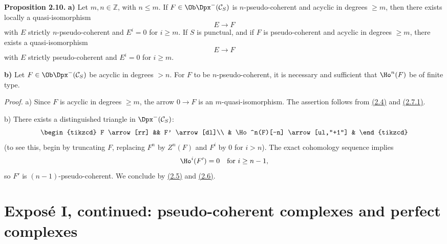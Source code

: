 \textbf{Proposition 2.10.} \textbf{a)} Let \(m,n\in\mathbb Z\), with \(n\leq m\). If \(F\in\Ob\Dpx^-(\mathcal C_S)\) is \(n\)-pseudo-coherent and acyclic in degrees \(\geq m\), then there exists locally a quasi-isomorphism
\[
  E\longrightarrow F
\]
with \(E\) strictly \(n\)-pseudo-coherent and \(E^i=0\) for \(i\geq m\). If \(S\) is punctual, and if \(F\) is pseudo-coherent and acyclic in degrees \(\geq m\), there exists a quasi-isomorphism
\[
  E\longrightarrow F
\]
with \(E\) strictly pseudo-coherent and \(E^i=0\) for \(i\geq m\).

\textbf{b)} Let \(F\in\Ob\Dpx^-(\mathcal C_S)\) be acyclic in degrees \(>n\). For \(F\) to be \(n\)-pseudo-coherent, it is necessary and sufficient that \(\Ho^n(F)\) be of finite type.

\emph{Proof.} a) Since \(F\) is acyclic in degrees \(\geq m\), the arrow \(0\to F\) is an \(m\)-quasi-isomorphism. The assertion follows from \hyperlink{sga6.e01.prop.2-4}{(2.4)} and \hyperlink{sga6.e01.prop.2-7-1}{(2.7.1)}.

b) There exists a distinguished triangle in \(\Dpx^-(\mathcal C_S)\):
\[
\begin{tikzcd}
F \arrow[rr] && F' \arrow[dl]\\
& \Ho^n(F)[-n] \arrow[ul,"+1"] &
\end{tikzcd}
\]
(to see this, begin by truncating \(F\), replacing \(F^n\) by \(Z^n(F)\) and \(F^i\) by \(0\) for \(i>n\)). The exact cohomology sequence implies
\[
  \Ho^i(F')=0\quad\text{for }i\geq n-1,
\]
so \(F'\) is \((n-1)\)-pseudo-coherent. We conclude by \hyperlink{sga6.e01.prop.2-5}{(2.5)} and \hyperlink{sga6.e01.schol.2-6}{(2.6)}.



\providecommand{\RHom}{\mathrm R\!\Hom}
\providecommand{\Ext}{\operatorname{Ext}}
\providecommand{\coh}{\operatorname{coh}}
\providecommand{\PreCoh}{\operatorname{precoh}}
\providecommand{\Tr}{\operatorname{Tr}}
\providecommand{\Qis}{\operatorname{Qis}}
\providecommand{\Rad}{\operatorname{rad}}
\providecommand{\Spec}{\operatorname{Spec}}
\providecommand{\End}{\operatorname{End}}
\providecommand{\Id}{\operatorname{Id}}
\providecommand{\varinjlim}{\mathop{\mathrm{lim}}\limits_{\longrightarrow}}
\providecommand{\varprojlim}{\mathop{\mathrm{lim}}\limits_{\longleftarrow}}
\providecommand{\qcoh}{\operatorname{qcoh}}
\providecommand{\amp}{\operatorname{amp}}


\section*{Exposé I, continued: pseudo-coherent complexes and perfect complexes}

